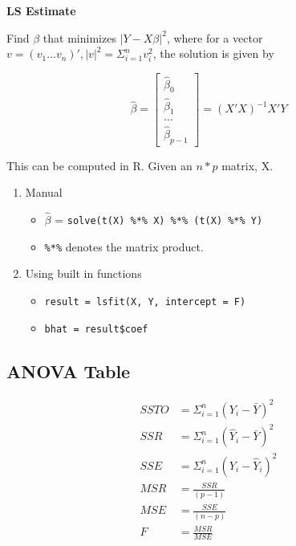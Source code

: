 \documentclass[10pt]{article}
\begin{document}
\begin{multicols}{3}
    \textbf{LS Estimate}

    Find $\beta$ that minimizes $|Y - X \beta|^2$, where for a vector $v = (v_1 \dots v_n)', |v|^2 = \Sigma_{i = 1}^n v^2_i$, the solution is given by

    \begin{equation}\label{LS multiple linear regression}
        \hat\beta = \left[\begin{matrix}
                \hat\beta_0 \\ \hat\beta_1 \\ \dots \\ \hat\beta_{p - 1}
            \end{matrix}\right]
        = (X'X)^{-1} X'Y
    \end{equation}

    This can be computed in R. Given an $n * p$ matrix, X.

    \begin{enumerate}
        \item Manual
              \begin{itemize}
                  \item $\hat\beta$ = \verb|solve(t(X) %*% X) %*% (t(X) %*% Y)|
                  \item \verb|%*%| denotes the matrix product.
              \end{itemize}
        \item Using built in functions
              \begin{itemize}
                  \item \verb|result = lsfit(X, Y, intercept = F)|
                  \item \verb|bhat = result$coef|
              \end{itemize}
    \end{enumerate}

    \subsection{ANOVA Table}

    \begin{align} \label{Sum Squares MLR}
        SSTO & = \Sigma^n_{i = 1} (Y_i - \bar Y)^2      \\
        SSR  & = \Sigma^n_{i = 1} (\hat Y_i - \bar Y)^2 \\
        SSE  & = \Sigma^n_{i = 1} (Y_i - \hat Y_i)^2    \\
        MSR  & = \frac{SSR}{(p - 1)}                    \\
        MSE  & = \frac{SSE}{(n - p)}                    \\
        F    & = \frac{MSR}{MSE}
    \end{align}


\end{multicols}
\end{document}
